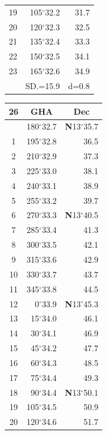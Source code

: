 \documentclass[10pt, a4paper]{report}
\begin{document}
\begin{scriptsize}
\begin{tabular*}{0.2\textwidth}[t]{@{\extracolsep{\fill}}|c|rr|}
19 & 105$^\circ$32.2 & 31.7\\
20 & 120$^\circ$32.3 & 32.5\\
21 & 135$^\circ$32.4 & \raisebox{0.24ex}{\boldmath$\cdot$~\boldmath$\cdot$~~}33.3\\
22 & 150$^\circ$32.5 & 34.1\\
23 & 165$^\circ$32.6 & 34.9\\
\hline
\rule{0pt}{2.4ex} & \multicolumn{1}{c}{SD.=15.9} & \multicolumn{1}{c|}{d=0.8}\\
\hline
\end{tabular*}\noindent
\begin{tabular*}{0.2\textwidth}[t]{@{\extracolsep{\fill}}|c|rr|}
\hline
\multicolumn{1}{|c|}{\rule{0pt}{2.6ex}\textbf{26}} & \multicolumn{1}{c}{\textbf{GHA}} & \multicolumn{1}{c|}{\textbf{Dec}}\\
\hline\rule{0pt}{2.6ex}\noindent
0 & 180$^\circ$32.7 & \textbf{N}13$^\circ$35.7\\
1 & 195$^\circ$32.8 & 36.5\\
2 & 210$^\circ$32.9 & 37.3\\
3 & 225$^\circ$33.0 & \raisebox{0.24ex}{\boldmath$\cdot$~\boldmath$\cdot$~~}38.1\\
4 & 240$^\circ$33.1 & 38.9\\
5 & 255$^\circ$33.2 & 39.7\\[2Pt]
6 & 270$^\circ$33.3 & \textbf{N}13$^\circ$40.5\\
7 & 285$^\circ$33.4 & 41.3\\
8 & 300$^\circ$33.5 & 42.1\\
9 & 315$^\circ$33.6 & \raisebox{0.24ex}{\boldmath$\cdot$~\boldmath$\cdot$~~}42.9\\
10 & 330$^\circ$33.7 & 43.7\\
11 & 345$^\circ$33.8 & 44.5\\[2Pt]
12 & 0$^\circ$33.9 & \textbf{N}13$^\circ$45.3\\
13 & 15$^\circ$34.0 & 46.1\\
14 & 30$^\circ$34.1 & 46.9\\
15 & 45$^\circ$34.2 & \raisebox{0.24ex}{\boldmath$\cdot$~\boldmath$\cdot$~~}47.7\\
16 & 60$^\circ$34.3 & 48.5\\
17 & 75$^\circ$34.4 & 49.3\\[2Pt]
18 & 90$^\circ$34.4 & \textbf{N}13$^\circ$50.1\\
19 & 105$^\circ$34.5 & 50.9\\
20 & 120$^\circ$34.6 & 51.7\\

\end{tabular*}
\end{scriptsize}
\end{document}
